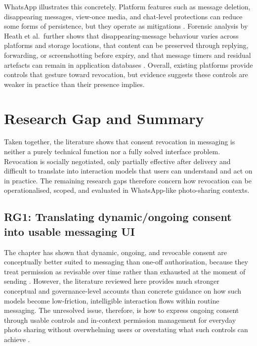 WhatsApp illustrates this concretely. Platform features such as message deletion, disappearing messages, view-once media, and chat-level protections can reduce some forms of persistence, but they operate as mitigations \cite{whatsapp_delete_messages,whatsapp_disappearing_messages,whatsapp_view_once,whatsapp_advanced_chat_privacy}. Forensic analysis by Heath et al.\ further shows that disappearing-message behaviour varies across platforms and storage locations, that content can be preserved through replying, forwarding, or screenshotting before expiry, and that message timers and residual artefacts can remain in application databases \cite{heath_2023}. Overall, existing platforms provide controls that gesture toward revocation, but evidence suggests these controls are weaker in practice than their presence implies.

\section{Research Gap and Summary}
Taken together, the literature shows that consent revocation in messaging is neither a purely technical function nor a fully solved interface problem. Revocation is socially negotiated, only partially effective after delivery and difficult to translate into interaction models that users can understand and act on in practice. The remaining research gaps therefore concern how revocation can be operationalised, scoped, and evaluated in WhatsApp-like photo-sharing contexts.

\subsection{RG1: Translating dynamic/ongoing consent into usable messaging UI}
The chapter has shown that dynamic, ongoing, and revocable consent are conceptually better suited to messaging than one-off authorisation, because they treat permission as revisable over time rather than exhausted at the moment of sending \cite{kaye_dynamic_2015,schuler_scott_dynamic_consent_2022,lee_identifying_2023,im_yes_2021}. However, the literature reviewed here provides much stronger conceptual and governance-level accounts than concrete guidance on how such models become low-friction, intelligible interaction flows within routine messaging. The unresolved issue, therefore, is how to express ongoing consent through usable controls and in-context permission management for everyday photo sharing without overwhelming users or overstating what such controls can achieve \cite{merlec_smart_2021,wilbanks_design_2018}.

